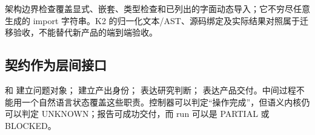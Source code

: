 架构边界检查覆盖显式、嵌套、类型检查和已列出的字面动态导入；它不穷尽任意生成的 import 字符串。K2 的归一化文本/AST、源码绑定及实际结果对照属于迁移验收，不能替代新产品的端到端验收。\cite{k2,acceptance}

\subsection{契约作为层间接口}
 和  建立问题对象； 建立产出身份； 表达研究判断； 表达产品交付。中间过程不能用一个自然语言状态覆盖这些职责。控制器可以判定“操作完成”，但语义内核仍可以判定 UNKNOWN；报告可成功交付，而 run 可以是 PARTIAL 或 BLOCKED。
